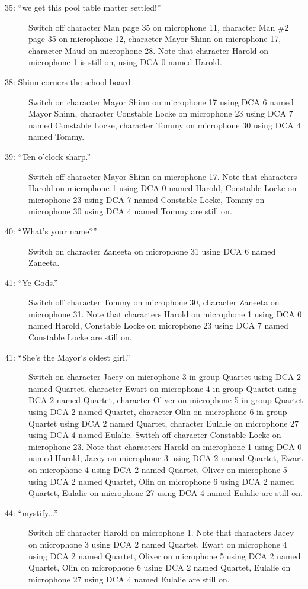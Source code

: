 \begin{description}
\item[35: ``we get this pool table matter settled!'']
Switch off character Man page 35 on microphone 11, character Man \#2 page 35 on microphone 12, character Mayor Shinn on microphone 17, character Maud on microphone 28. Note that character Harold on microphone 1 is still on, using DCA 0 named Harold.

\item[38: Shinn corners the school board]
Switch on character Mayor Shinn on microphone 17 using DCA 6 named Mayor Shinn, character Constable Locke on microphone 23 using DCA 7 named Constable Locke, character Tommy on microphone 30 using DCA 4 named Tommy. 

\item[39: ``Ten o'clock sharp.'']
Switch off character Mayor Shinn on microphone 17. Note that characters Harold on microphone 1 using DCA 0 named Harold, Constable Locke on microphone 23 using DCA 7 named Constable Locke, Tommy on microphone 30 using DCA 4 named Tommy are still on.  

\item[40: ``What's your name?'']
Switch on character Zaneeta on microphone 31 using DCA 6 named Zaneeta. 

\item[41: ``Ye Gods.'']
Switch off character Tommy on microphone 30, character Zaneeta on microphone 31. Note that characters Harold on microphone 1 using DCA 0 named Harold, Constable Locke on microphone 23 using DCA 7 named Constable Locke are still on.  

\item[41: ``She's the Mayor's oldest girl.'']
Switch on character Jacey on microphone 3 in group Quartet using DCA 2 named Quartet, character Ewart on microphone 4 in group Quartet using DCA 2 named Quartet, character Oliver on microphone 5 in group Quartet using DCA 2 named Quartet, character Olin on microphone 6 in group Quartet using DCA 2 named Quartet, character Eulalie on microphone 27 using DCA 4 named Eulalie. Switch off character Constable Locke on microphone 23. Note that characters Harold on microphone 1 using DCA 0 named Harold, Jacey on microphone 3 using DCA 2 named Quartet, Ewart on microphone 4 using DCA 2 named Quartet, Oliver on microphone 5 using DCA 2 named Quartet, Olin on microphone 6 using DCA 2 named Quartet, Eulalie on microphone 27 using DCA 4 named Eulalie are still on.  

\item[44: ``mystify...'']
Switch off character Harold on microphone 1. Note that characters Jacey on microphone 3 using DCA 2 named Quartet, Ewart on microphone 4 using DCA 2 named Quartet, Oliver on microphone 5 using DCA 2 named Quartet, Olin on microphone 6 using DCA 2 named Quartet, Eulalie on microphone 27 using DCA 4 named Eulalie are still on.  


\end{description}
